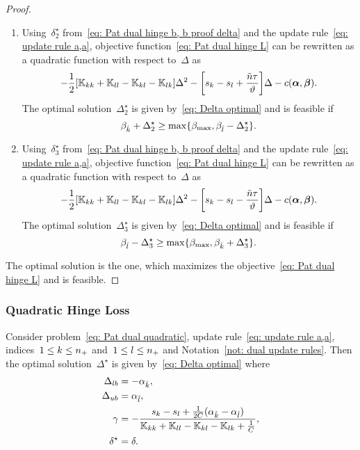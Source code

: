 \begin{proof}
\begin{enumerate}
    \item Using~$\delta^{\star}_2$ from~\eqref{eq: Pat dual hinge b, b proof delta} and the update rule~\eqref{eq: update rule a,a}, objective function~\eqref{eq: Pat dual hinge L} can be rewritten as a quadratic function with respect to~$\Delta$ as
    \begin{equation*}
      - \frac{1}{2} \Brac[s]{\K_{kk} + \K_{ll} - \K_{kl} - \K_{lk}} \Delta^2
      - \Brac[s]{s_k - s_l + \frac{\ntil \tau}{\vartheta}} \Delta
      - c(\bm{\alpha}, \bm{\beta}).
    \end{equation*}
    The optimal solution~$\Delta^{\star}_2$ is given by~\eqref{eq: Delta optimal} and is feasible if
    \begin{equation*}
      \beta_{\hat{k}} + \Delta^{\star}_2 \geq \max\{\beta_{\max} , \beta_{\hat{l}} - \Delta^{\star}_2\}.
    \end{equation*}

    \item Using~$\delta^{\star}_3$ from~\eqref{eq: Pat dual hinge b, b proof delta} and the update rule~\eqref{eq: update rule a,a}, objective function~\eqref{eq: Pat dual hinge L} can be rewritten as a quadratic function with respect to~$\Delta$ as
    \begin{equation*}
      - \frac{1}{2} \Brac[s]{\K_{kk} + \K_{ll} - \K_{kl} - \K_{lk}} \Delta^2
      - \Brac[s]{s_k - s_l - \frac{\ntil \tau}{\vartheta}} \Delta
      - c(\bm{\alpha}, \bm{\beta}).
    \end{equation*}
    The optimal solution~$\Delta^{\star}_3$ is given by~\eqref{eq: Delta optimal} and is feasible if
    \begin{equation*}
      \beta_{\hat{l}} - \Delta^{\star}_3 \geq \max\{\beta_{\max}, \beta_{\hat{k}} + \Delta^{\star}_3\}.
    \end{equation*}
  \end{enumerate}
  The optimal solution is the one, which maximizes the objective~\eqref{eq: Pat dual hinge L} and is feasible.
\end{proof}

\subsubsection{Quadratic Hinge Loss}

\begin{lemma}\label{thm: patmat family quadratic update a,a}
  Consider problem~\eqref{eq: Pat dual quadratic}, update rule~\eqref{eq: update rule a,a}, indices~$1 \leq k \leq n_{+}$ and~$1 \leq l \leq n_{+}$  and Notation~\ref{not: dual update rules}. Then the optimal solution~$\Delta^{\star}$ is given by~\eqref{eq: Delta optimal} where
  \begin{align*}
    \Delta_{lb} & = -\alpha_{\hat{k}}, \\
    \Delta_{ub} & = \alpha_{\hat{l}}, \\
    \gamma & = -\frac{s_k - s_l + \frac{1}{2C}(\alpha_{\hat{k}} - \alpha_{\hat{l}})}{\mathbb{K}_{kk} + \mathbb{K}_{ll} - \mathbb{K}_{kl} - \mathbb{K}_{lk} + \frac{1}{C}}, \\
    \delta^{\star}  & = \delta.
  \end{align*}
\end{lemma}

